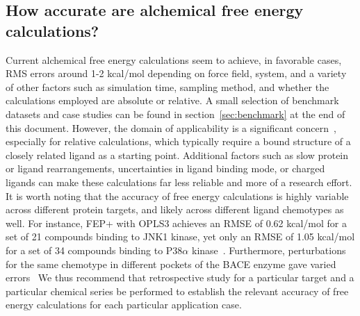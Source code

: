 \documentclass[9pt,bestpractices]{livecoms}
\begin{document}
\subsection{How accurate are alchemical free energy calculations?}
\label{subsec:expectation}
%
Current alchemical free energy calculations seem to achieve, in favorable cases, RMS errors around 1-2 kcal/mol depending on force field, system, and a variety of other factors such as simulation time, sampling method, and whether the calculations employed are absolute or relative. A small selection of benchmark datasets and case studies can be found in section~\ref{sec:benchmark} at the end of this document.
However, the domain of applicability is a significant concern~\cite{sherborne2016collaborating, cournia2017relative}, especially for relative calculations, which typically require a bound structure of a closely
related ligand as a starting point. Additional factors such as slow protein or ligand rearrangements, uncertainties in ligand binding mode, or charged ligands can make these calculations far less reliable and more of a research effort.
%
It is worth noting that the accuracy of free energy calculations is highly variable across different protein targets, and likely across different ligand chemotypes as well. For instance, FEP+ with OPLS3 achieves an RMSE of 0.62 kcal/mol for a set of 21 compounds binding to JNK1 kinase, yet only an RMSE of 1.05 kcal/mol for a set of 34 compounds binding to P38$\alpha$ kinase~\cite{harder2016opls3}. Furthermore, perturbations for the same chemotype in different pockets of the BACE enzyme gave varied errors~\cite{keranen2017acylguanidine}
We thus recommend that retrospective study for a particular target and a particular chemical series be performed to establish the relevant accuracy of free energy calculations for each particular application case.
%
\end{document}

